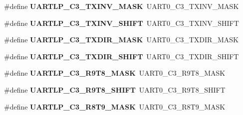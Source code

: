 \begin{DoxyCompactItemize}
\#define {\bfseries U\+A\+R\+T\+L\+P\+\_\+\+C3\+\_\+\+T\+X\+I\+N\+V\+\_\+\+M\+A\+SK}~U\+A\+R\+T0\+\_\+\+C3\+\_\+\+T\+X\+I\+N\+V\+\_\+\+M\+A\+SK
\item 
\mbox{\label{group___backward___compatibility___symbols_gac43e73179815a02e03de14d95c1d29f0}} 
\#define {\bfseries U\+A\+R\+T\+L\+P\+\_\+\+C3\+\_\+\+T\+X\+I\+N\+V\+\_\+\+S\+H\+I\+FT}~U\+A\+R\+T0\+\_\+\+C3\+\_\+\+T\+X\+I\+N\+V\+\_\+\+S\+H\+I\+FT
\item 
\mbox{\label{group___backward___compatibility___symbols_ga95dff3853a66ebeee996b014536f86bf}} 
\#define {\bfseries U\+A\+R\+T\+L\+P\+\_\+\+C3\+\_\+\+T\+X\+D\+I\+R\+\_\+\+M\+A\+SK}~U\+A\+R\+T0\+\_\+\+C3\+\_\+\+T\+X\+D\+I\+R\+\_\+\+M\+A\+SK
\item 
\mbox{\label{group___backward___compatibility___symbols_gacb749efddf2ff0881a30fa3b0b0fd6ec}} 
\#define {\bfseries U\+A\+R\+T\+L\+P\+\_\+\+C3\+\_\+\+T\+X\+D\+I\+R\+\_\+\+S\+H\+I\+FT}~U\+A\+R\+T0\+\_\+\+C3\+\_\+\+T\+X\+D\+I\+R\+\_\+\+S\+H\+I\+FT
\item 
\mbox{\label{group___backward___compatibility___symbols_gaad5e79813f247fac083e627e4125a1b0}} 
\#define {\bfseries U\+A\+R\+T\+L\+P\+\_\+\+C3\+\_\+\+R9\+T8\+\_\+\+M\+A\+SK}~U\+A\+R\+T0\+\_\+\+C3\+\_\+\+R9\+T8\+\_\+\+M\+A\+SK
\item 
\mbox{\label{group___backward___compatibility___symbols_gaaffea46f675353dc12aa3b19a9da33b0}} 
\#define {\bfseries U\+A\+R\+T\+L\+P\+\_\+\+C3\+\_\+\+R9\+T8\+\_\+\+S\+H\+I\+FT}~U\+A\+R\+T0\+\_\+\+C3\+\_\+\+R9\+T8\+\_\+\+S\+H\+I\+FT
\item 
\mbox{\label{group___backward___compatibility___symbols_gabe3e5842a9d28fcc4699ab569b79d2d6}} 
\#define {\bfseries U\+A\+R\+T\+L\+P\+\_\+\+C3\+\_\+\+R8\+T9\+\_\+\+M\+A\+SK}~U\+A\+R\+T0\+\_\+\+C3\+\_\+\+R8\+T9\+\_\+\+M\+A\+SK
\item 
\mbox{\label{group___backward___compatibility___symbols_gadd1520225db488c74cb9f850c1bf1e99}} 

\end{DoxyCompactItemize}
